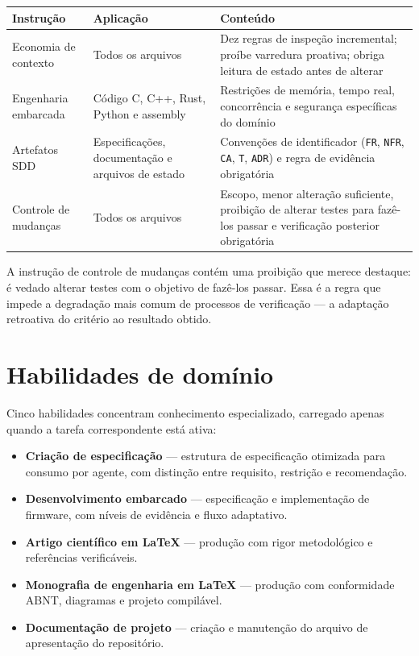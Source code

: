 \begin{quadro}[htb]
	\caption{Instruções permanentes do framework}
	\label{qua:instrucoes}
	\centering
	\footnotesize
	\begin{tabularx}{\textwidth}{@{}p{4.2cm} p{2.6cm} X@{}}
		\toprule
		\textbf{Instrução} & \textbf{Aplicação} & \textbf{Conteúdo} \\
		\midrule
		Economia de contexto & Todos os arquivos & Dez regras de inspeção incremental; proíbe varredura proativa; obriga leitura de estado antes de alterar \\
		\addlinespace
		Engenharia embarcada & Código C, C++, Rust, Python e assembly & Restrições de memória, tempo real, concorrência e segurança específicas do domínio \\
		\addlinespace
		Artefatos SDD & Especificações, documentação e arquivos de estado & Convenções de identificador (\texttt{FR}, \texttt{NFR}, \texttt{CA}, \texttt{T}, \texttt{ADR}) e regra de evidência obrigatória \\
		\addlinespace
		Controle de mudanças & Todos os arquivos & Escopo, menor alteração suficiente, proibição de alterar testes para fazê-los passar e verificação posterior obrigatória \\
		\bottomrule
	\end{tabularx}
\end{quadro}

A instrução de controle de mudanças contém uma proibição que merece destaque:
é vedado alterar testes com o objetivo de fazê-los passar. Essa é a regra que
impede a degradação mais comum de processos de verificação --- a adaptação
retroativa do critério ao resultado obtido.

\section{Habilidades de domínio}
\label{sec:fw-skills}

Cinco habilidades concentram conhecimento especializado, carregado apenas quando a
tarefa correspondente está ativa:

\begin{itemize}
	\item \textbf{Criação de especificação} --- estrutura de especificação otimizada para consumo por agente, com distinção entre requisito, restrição e recomendação.
	\item \textbf{Desenvolvimento embarcado} --- especificação e implementação de firmware, com níveis de evidência e fluxo adaptativo.
	\item \textbf{Artigo científico em LaTeX} --- produção com rigor metodológico e referências verificáveis.
	\item \textbf{Monografia de engenharia em LaTeX} --- produção com conformidade ABNT, diagramas e projeto compilável.
	\item \textbf{Documentação de projeto} --- criação e manutenção do arquivo de apresentação do repositório.
\end{itemize}

